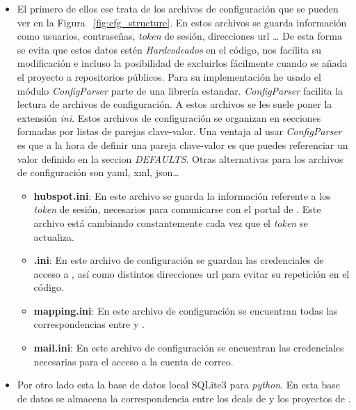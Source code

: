 \begin{itemize}[leftmargin=*]
\item El primero de ellos ese trata de los archivos de configuración que se pueden ver en la Figura ~\ref{fig:cfg_structure}.
En estos archivos se guarda información como usuarios, contraseñas, \textit{token} de sesión, direcciones url \ldots
De esta forma se evita que estos datos estén \textit{Hardcodeados} en el código, nos facilita su modificación e
incluso la posibilidad de excluirlos fácilmente cuando se añada el proyecto a repositorios públicos.
Para su implementación he usado el módulo \textit{ConfigParser} \cite{ConfigParser} parte de una librería estandar. \textit{ConfigParser} facilita la lectura de archivos de configuración. A estos archivos se les suele poner la extensión \textit{ini}.
Estos archivos de configuración se organizan en secciones formadas por listas de parejas clave-valor.
Una ventaja al usar \textit{ConfigParser} es que a la hora de definir una pareja clave-valor es que puedes referenciar un valor definido en la seccion \textit{DEFAULTS}.
Otras alternativas para los archivos de configuración son yaml, xml, json\ldots



\begin{itemize}
	\item [\textendash] \textbf{hubspot.ini}: En este archivo se guarda la información referente a los \textit{token} de sesión, necesarios para comunicarse con el portal de \hs. 
	Este archivo está cambiando constantemente cada vez que el \textit{token} se actualiza.
	\item [\textendash] \textbf{\wday.ini}: En este archivo de configuración se 
	guardan las credenciales de acceso a \wday{}, así como distintos direcciones url para evitar su repetición en el código.
	\item [\textendash] \textbf{mapping.ini}: En este archivo de configuración se encuentran todas las correspondencias entre \hs{} y \wday.
	\item [\textendash] \textbf{mail.ini}: En este archivo de configuración se encuentran las credenciales necesarias para el acceso a la cuenta de correo.
\end{itemize}




\item Por otro lado esta la base de datos local SQLite3 \cite{sqlite3} para \textit{python}.
 En esta base de datos se almacena la correspondencia entre los deals de \hs{} y los proyectos de \wday.
 

\end{itemize}
